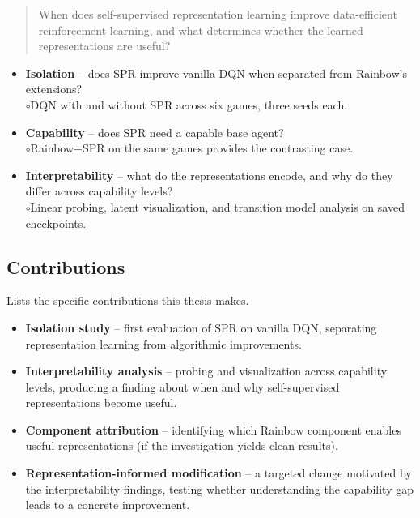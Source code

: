 \documentclass[11pt]{article}
\begin{document}
\begin{quote}
\vspace{-0.3em}
When does self-supervised representation learning improve
data-efficient reinforcement learning, and what determines whether
the learned representations are useful?
\vspace{-0.3em}
\end{quote}
\vspace{-0.5em}
\begin{itemize}
\item \textbf{Isolation} -- does SPR improve vanilla DQN when separated
  from Rainbow's extensions?\\[0.1em]
  \hspace*{1.5em}$\circ$\hspace{0.5em}DQN with and without SPR across
    six games, three seeds each.
\item \textbf{Capability} -- does SPR need a capable base agent?\\[0.1em]
  \hspace*{1.5em}$\circ$\hspace{0.5em}Rainbow+SPR on the same games
    provides the contrasting case.
\item \textbf{Interpretability} -- what do the representations encode,
  and why do they differ across capability levels?\\[0.1em]
  \hspace*{1.5em}$\circ$\hspace{0.5em}Linear probing, latent
    visualization, and transition model analysis on saved checkpoints.
\end{itemize}

\subsection{Contributions}

\noindent Lists the specific contributions this thesis makes.

\begin{itemize}
\item \textbf{Isolation study} -- first evaluation of SPR on vanilla
  DQN, separating representation learning from algorithmic
  improvements.
\item \textbf{Interpretability analysis} -- probing and visualization
  across capability levels, producing a finding about when and why
  self-supervised representations become useful.
\item \textbf{Component attribution} -- identifying which Rainbow
  component enables useful representations (if the investigation
  yields clean results).
\item \textbf{Representation-informed modification} -- a targeted change
  motivated by the interpretability findings, testing whether
  understanding the capability gap leads to a concrete improvement.
\end{itemize}
\end{document}

